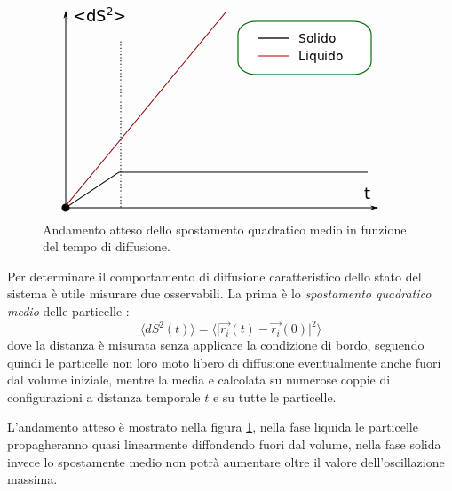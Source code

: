 \documentclass[11pt]{article}
\theoremstyle{plain}
\theoremstyle{remark}
\begin{document}
\begin{itemize}
\begin{figure}[h!]\vspace{-5pt}
     \begin{minipage}{0.55\textwidth}
		\begin{flushright}
		\includegraphics[scale=0.5]{Immagini/dS_quad_exp.png}
		\end{flushright}
     \end{minipage}\hfill
     \begin{minipage}{0.4\textwidth}
     	\begin{flushleft}
		\caption[Spostamento quadratico medio atteso]{Andamento atteso dello spostamento quadratico medio in funzione del tempo di diffusione.}\label{fig: dS_quad_exp}
     \end{flushleft}
     \end{minipage}\vspace{-5pt}
  \end{figure}

Per determinare il comportamento di diffusione caratteristico dello stato del sistema è utile misurare due osservabili.
La prima è lo \emph{spostamento quadratico medio} delle particelle :
\begin{equation}
\biggr\langle dS^2(t) \biggr\rangle = \biggr\langle\big\vert \vec{r_i}(t) - \vec{r_i}(0) \big\vert^2  \biggr\rangle
\end{equation}
dove la distanza è misurata senza applicare la condizione di bordo, seguendo quindi le particelle non loro moto libero di diffusione eventualmente anche fuori dal volume iniziale, mentre la media e calcolata su numerose coppie di configurazioni a distanza temporale $t$ e su tutte le particelle.

L'andamento atteso è mostrato nella figura \ref{fig: dS_quad_exp}, nella fase liquida le particelle propagheranno quasi linearmente diffondendo fuori dal volume, nella fase solida invece lo spostamente medio non potrà aumentare oltre il valore dell'oscillazione massima.
\medskip


\end{itemize}
\end{document}
